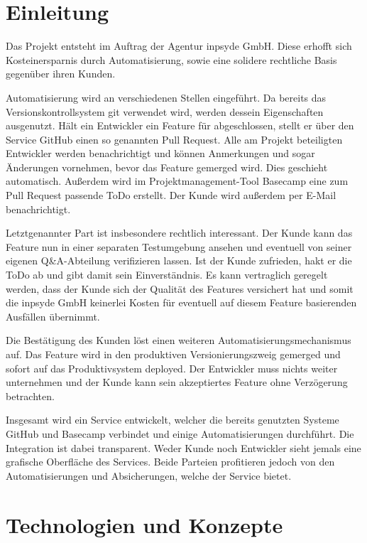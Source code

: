 \section{Einleitung} %
\label{sec:einleitung}

Das Projekt entsteht im Auftrag der Agentur inpsyde GmbH. Diese erhofft sich Kosteinersparnis durch Automatisierung, sowie eine solidere rechtliche Basis gegenüber ihren Kunden.

Automatisierung wird an verschiedenen Stellen eingeführt. Da bereits das Versionskontrollsystem git verwendet wird, werden dessein Eigenschaften ausgenutzt. Hält ein Entwickler ein Feature für abgeschlossen, stellt er über den Service GitHub einen so genannten Pull Request. Alle am Projekt beteiligten Entwickler werden benachrichtigt und können Anmerkungen und sogar Änderungen vornehmen, bevor das Feature gemerged wird. Dies geschieht automatisch. Außerdem wird im Projektmanagement-Tool Basecamp eine zum Pull Request passende ToDo erstellt. Der Kunde wird außerdem per E-Mail benachrichtigt.

Letztgenannter Part ist insbesondere rechtlich interessant. Der Kunde kann das Feature nun in einer separaten Testumgebung ansehen und eventuell von seiner eigenen Q\&A-Abteilung verifizieren lassen. Ist der Kunde zufrieden, hakt er die ToDo ab und gibt damit sein Einverständnis. Es kann vertraglich geregelt werden, dass der Kunde sich der Qualität des Features versichert hat und somit die inpsyde GmbH keinerlei Kosten für eventuell auf diesem Feature basierenden Ausfällen übernimmt.

Die Bestätigung des Kunden löst einen weiteren Automatisierungsmechanismus auf. Das Feature wird in den produktiven Versionierungszweig gemerged und sofort auf das Produktivsystem deployed. Der Entwickler muss nichts weiter unternehmen und der Kunde kann sein akzeptiertes Feature ohne Verzögerung betrachten.

Insgesamt wird ein Service entwickelt, welcher die bereits genutzten Systeme GitHub und Basecamp verbindet und einige Automatisierungen durchführt. Die Integration ist dabei transparent. Weder Kunde noch Entwickler sieht jemals eine grafische Oberfläche des Services. Beide Parteien profitieren jedoch von den Automatisierungen und Absicherungen, welche der Service bietet.


\section{Technologien und Konzepte} %
\label{sec:technologien_und_konzepte}

